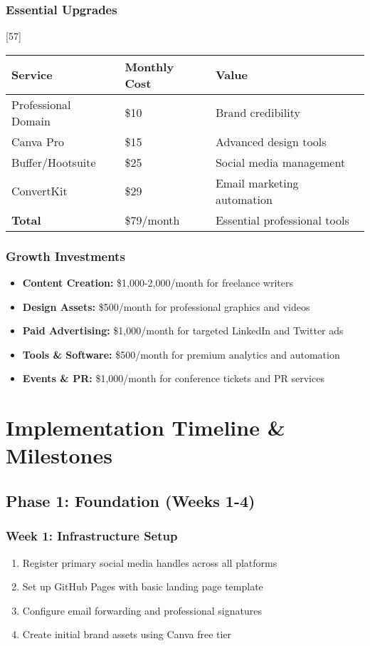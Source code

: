 \documentclass[12pt,a4paper]{article}
\begin{document}
\subsubsection{Essential Upgrades}[57]
\begin{center}
\begin{tabular}{|l|l|l|}
\hline
\textbf{Service} & \textbf{Monthly Cost} & \textbf{Value} \\
\hline
Professional Domain & \$10 & Brand credibility \\
Canva Pro & \$15 & Advanced design tools \\
Buffer/Hootsuite & \$25 & Social media management \\
ConvertKit & \$29 & Email marketing automation \\
\hline
\textbf{Total} & \$79/month & Essential professional tools \\
\hline
\end{tabular}
\end{center}

\subsubsection{Growth Investments}
\begin{itemize}
    \item \textbf{Content Creation:} \$1,000-2,000/month for freelance writers
    \item \textbf{Design Assets:} \$500/month for professional graphics and videos
    \item \textbf{Paid Advertising:} \$1,000/month for targeted LinkedIn and Twitter ads
    \item \textbf{Tools \& Software:} \$500/month for premium analytics and automation
    \item \textbf{Events \& PR:} \$1,000/month for conference tickets and PR services
\end{itemize}

\section{Implementation Timeline \& Milestones}

\subsection{Phase 1: Foundation (Weeks 1-4)}

\subsubsection{Week 1: Infrastructure Setup}
\begin{enumerate}
    \item Register primary social media handles across all platforms
    \item Set up GitHub Pages with basic landing page template
    \item Configure email forwarding and professional signatures
    \item Create initial brand assets using Canva free tier
\end{enumerate}
\end{document}
